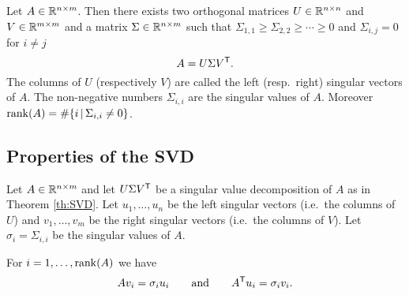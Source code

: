\documentclass[11pt,nocut]{article}
\begin{document}
\begin{theorem}\label{th:SVD}
	Let $A \in \mathbb{R}^{n \times m}$. Then there exists two orthogonal matrices $U \in \mathbb{R}^{n \times n}$ and $V \in \mathbb{R}^{m \times m}$ and a matrix $\Sigma \in \mathbb{R}^{n \times m}$ such that $\Sigma_{1,1} \geq \Sigma_{2,2}  \geq \cdots \geq 0$ and $\Sigma_{i,j} = 0$ for $i\neq j$
	$$
	A = U \Sigma V^{{\sf T}}.
	$$
	The columns of $U$ (respectively $V$) are called the left (resp.\ right) singular vectors of $A$. The non-negative numbers $\Sigma_{i,i}$ are the singular values of $A$. Moreover ${{\rm rank}}(A) = \# \{i \, | \, \Sigma_{i,i} \neq 0 \}$.
\end{theorem}

\subsection{Properties of the SVD}

Let $A \in \mathbb{R}^{n \times m}$ and let $U \Sigma V^{{\sf T}}$ be a singular value decomposition of $A$ as in Theorem \ref{th:SVD}. Let $u_1, \dots, u_n$ be the left singular vectors (i.e.\ the columns of $U$) and $v_1, \dots, v_m$ be the right singular vectors (i.e.\ the columns of $V$). Let $\sigma_i = \Sigma_{i,i}$ be the singular values of $A$.

\begin{proposition}
	For $i=1, \dots, {{\rm rank}}(A)$ we have
	$$
	A v_i = \sigma_i u_i
	\qquad \text{and} \qquad
	A^{{\sf T}} u_i = \sigma_i v_i.
	$$
\end{proposition}
\end{document}
